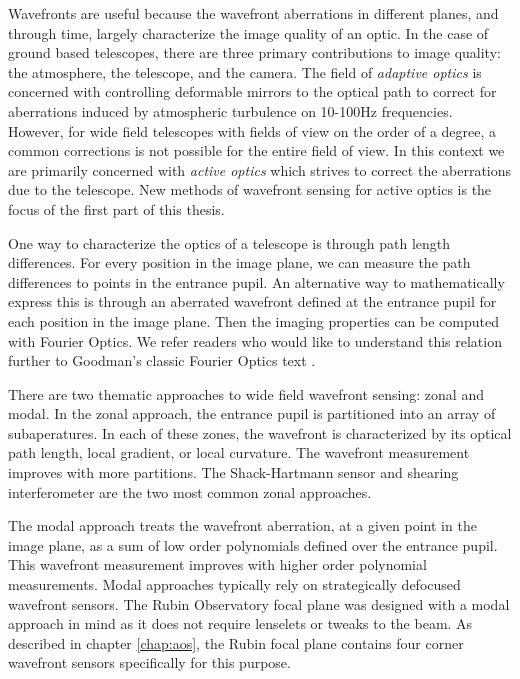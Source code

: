 Wavefronts are useful because the wavefront aberrations in different planes, and through time, largely characterize the image quality of an optic. In the case of ground based telescopes, there are three primary contributions to image quality: the atmosphere, the telescope, and the camera. The field of \textit{adaptive optics} is concerned with controlling deformable mirrors to the optical path to correct for aberrations induced by atmospheric turbulence on 10-100Hz frequencies. However, for wide field telescopes with fields of view on the order of a degree, a common corrections is not possible for the entire field of view. In this context we are primarily concerned with \textit{active optics} which strives to correct the aberrations due to the telescope. New methods of wavefront sensing for active optics is the focus of the first part of this thesis.

One way to characterize the optics of a telescope is through path length differences. For every position in the image plane, we can measure the path differences to points in the entrance pupil. An alternative way to mathematically express this is through an aberrated wavefront defined at the entrance pupil for each position in the image plane. Then the imaging properties can be computed with Fourier Optics. We refer readers who would like to understand this relation further to Goodman's classic Fourier Optics text \cite{goodman2005introduction}. 

There are two thematic approaches to wide field wavefront sensing: zonal and modal. In the zonal approach, the entrance pupil is partitioned into an array of subaperatures. In each of these zones, the wavefront is characterized by its optical path length, local gradient, or local curvature. The wavefront measurement improves with more partitions. The Shack-Hartmann sensor and shearing interferometer are the two most common zonal approaches.

The modal approach treats the wavefront aberration, at a given point in the image plane, as a sum of low order polynomials defined over the entrance pupil. This wavefront measurement improves with higher order polynomial measurements. Modal approaches typically rely on strategically defocused wavefront sensors. The Rubin Observatory focal plane was designed with a modal approach in mind as it does not require lenselets or tweaks to the beam. As described in chapter \ref{chap:aos}, the Rubin focal plane contains four corner wavefront sensors specifically for this purpose.

